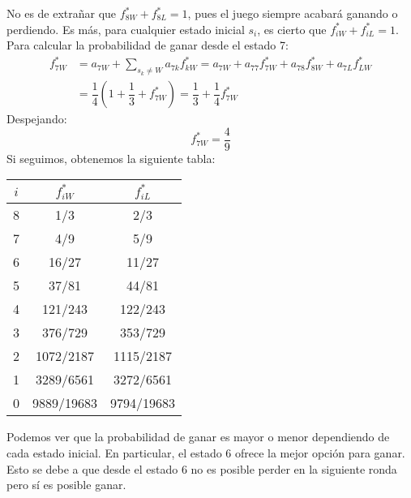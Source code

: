 \begin{exampleth}
No es de extrañar que $f_{8W}^*+f_{8L}^*=1$, pues el juego siempre acabará ganando o perdiendo. Es más, para cualquier estado inicial $s_i$, es cierto que $f_{iW}^*+f_{iL}^*=1$. Para calcular la probabilidad de ganar desde el estado 7:
\[
\begin{aligned}
    f_{7W}^*&=a_{7W}+\sum_{s_k\neq W}a_{7k}f_{kW}^*=a_{7W}+a_{77}f_{7W}^*+a_{78}f_{8W}^*+a_{7L}f_{LW}^*\\
    &=\dfrac{1}{4}\left(1+\dfrac{1}{3}+f_{7W}^*\right)=\dfrac{1}{3}+\dfrac{1}{4}f_{7W}^*
\end{aligned}    
\]
Despejando:
\[f_{7W}^*=\dfrac{4}{9}\]
Si seguimos, obtenemos la siguiente tabla:
\begin{center}
    \begin{tabular}{|c|c|c|}
        \hline
        $i$ & $f_{iW}^*$ & $f_{iL}^*$  \\
        \hline   
        8 & 1/3 & 2/3 \\
        \hline
        7 & 4/9 & 5/9 \\
        \hline
        6 & 16/27 & 11/27\\
        \hline
        5 & 37/81 & 44/81 \\
        \hline
        4 & 121/243 & 122/243\\
        \hline
        3 & 376/729 & 353/729\\
        \hline
        2 & 1072/2187 & 1115/2187\\
        \hline
        1 & 3289/6561 & 3272/6561\\
        \hline
        0 & 9889/19683 & 9794/19683\\
        \hline
    \end{tabular}
\end{center}    
Podemos ver que la probabilidad de ganar es mayor o menor dependiendo de cada estado inicial. En particular, el estado 6 ofrece la mejor opción para ganar. Esto se debe a que desde el estado 6 no es posible perder en la siguiente ronda pero sí es posible ganar.
\end{exampleth}


